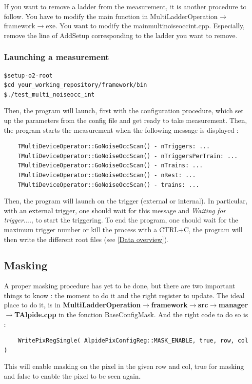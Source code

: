 \documentclass[12pt,oneside,a4]{article}
\begin{document}
If you want to remove a ladder from the measurement, it is another procedure to follow. You have to modify the main function in  MultiLadderOperation$\rightarrow$framework$\rightarrow$exe. You want to modify the main\textunderscore multinoiseocc\textunderscore int.cpp. Especially, remove the line of AddSetup corresponding to the ladder you want to remove. 

\subsubsection{Launching a measurement}


\begin{verbatim}
$setup-o2-root
$cd your_working_repository/framework/bin
$./test_multi_noiseocc_int
\end{verbatim}

Then, the program will launch, first with the configuration procedure, which set up the parameters from the config file and get ready to take measurement. Then, the program starts the measurement when the following message is displayed : 
\begin{verbatim}
    TMultiDeviceOperator::GoNoiseOccScan() - nTriggers: ...
    TMultiDeviceOperator::GoNoiseOccScan() - nTriggersPerTrain: ...
    TMultiDeviceOperator::GoNoiseOccScan() - nTrains: ...
    TMultiDeviceOperator::GoNoiseOccScan() - nRest: ...
    TMultiDeviceOperator::GoNoiseOccScan() - trains: ...
\end{verbatim}

Then, the program will launch on the trigger (external or internal). In particular, with an external trigger, one should wait for this message and \textit{Waiting for trigger...}., to start the triggering. 
To end the program, one should wait for the maximum trigger number or kill the process with a CTRL+C, the program will then write the different root files (see \ref{Data overview}).


       
    \subsection{Masking}
A proper masking procedure has yet to be done, but there are two important things to know : the moment to do it and the right register to update. The ideal place to do it, is in \textbf{MultiLadderOperation$\rightarrow$framework$\rightarrow$src$\rightarrow$manager$\rightarrow$TAlpide.cpp} in the fonction BaseConfigMask. And the right code to do so is : 
\begin{verbatim}
    WritePixRegSingle( AlpidePixConfigReg::MASK_ENABLE, true, row, col )
\end{verbatim}
This will enable masking on the pixel in the given row and col, true for masking and false to enable the pixel to be seen again.
\end{document}
